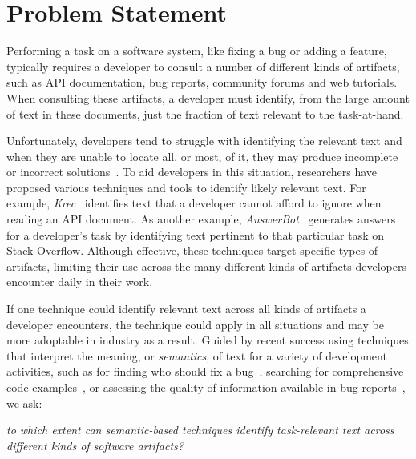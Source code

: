 
\section{Problem Statement}
\label{cp5:motivation}



Performing a task on a software system, like fixing a bug
or adding a feature, typically requires a developer to consult
a number of different kinds of artifacts, such
as API documentation, bug reports, community forums
and web tutorials.  When consulting these artifacts,
a developer must identify, from the large amount of text
in these documents, just the fraction of text relevant
to the task-at-hand.



Unfortunately, developers tend to struggle with identifying
the relevant text and when they are unable to locate all, or most, of it,
they may produce incomplete or incorrect solutions~\cite{Murphy2005}.
To aid developers in this situation,
researchers have proposed various 
techniques and tools to
identify likely relevant text.
For example, 
\textit{Krec}~\cite{Robillard2015}
identifies text that a developer cannot afford to ignore when reading an API document. 
As another example,
\textit{AnswerBot}~\cite{Xu2017} generates answers for a developer's
task by identifying text pertinent to that particular task on Stack Overflow.
Although effective, these techniques target specific
types of artifacts, limiting their use across the 
many different kinds of artifacts developers encounter
daily in their work.



If one technique could identify relevant text across all kinds
of artifacts a developer encounters, the technique 
could apply in all situations and may be more adoptable in industry
as a result. Guided by recent success  using
techniques that interpret the meaning, or \textit{semantics}, of text
for a variety of development activities, such as
for finding who should fix a bug~\cite{yang2016}, searching for comprehensive code examples~\cite{silva2019}, 
or assessing the quality of information available in bug reports~\cite{chaparro2019}, we ask:



\medskip
\begin{bluequote}
    \textit{to which extent can semantic-based techniques identify task-relevant text across different kinds of software artifacts?}
\end{bluequote}





